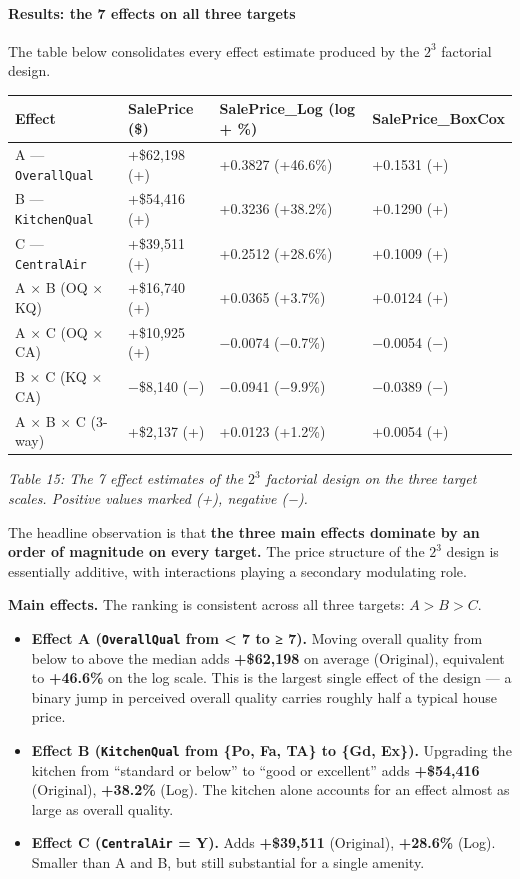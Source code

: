\paragraph{Results: the 7 effects on all three
targets}\label{results-the-7-effects-on-all-three-targets}

The table below consolidates every effect estimate produced by the
\(2^3\) factorial design.

\begin{longtable}[]{@{}llll@{}}
\toprule\noalign{}
Effect & SalePrice (\$) & SalePrice\_Log (log + \%) &
SalePrice\_BoxCox \\
\midrule\noalign{}
\endhead
\bottomrule\noalign{}
\endlastfoot
A --- \texttt{OverallQual} & +\$62,198 (+) & +0.3827 (+46.6\%) & +0.1531
(+) \\
B --- \texttt{KitchenQual} & +\$54,416 (+) & +0.3236 (+38.2\%) & +0.1290
(+) \\
C --- \texttt{CentralAir} & +\$39,511 (+) & +0.2512 (+28.6\%) & +0.1009
(+) \\
A × B (OQ × KQ) & +\$16,740 (+) & +0.0365 (+3.7\%) & +0.0124 (+) \\
A × C (OQ × CA) & +\$10,925 (+) & −0.0074 (−0.7\%) & −0.0054 (−) \\
B × C (KQ × CA) & −\$8,140 (−) & −0.0941 (−9.9\%) & −0.0389 (−) \\
A × B × C (3-way) & +\$2,137 (+) & +0.0123 (+1.2\%) & +0.0054 (+) \\
\end{longtable}

\emph{Table 15: The 7 effect estimates of the \(2^3\) factorial design
on the three target scales. Positive values marked (+), negative (−).}

The headline observation is that \textbf{the three main effects dominate
by an order of magnitude on every target.} The price structure of the
\(2^3\) design is essentially additive, with interactions playing a
secondary modulating role.

\textbf{Main effects.} The ranking is consistent across all three
targets: \(A > B > C\).

\begin{itemize}
\tightlist
\item
  \textbf{Effect A (\texttt{OverallQual} from \textless{} 7 to ≥ 7).}
  Moving overall quality from below to above the median adds
  \textbf{+\$62,198} on average (Original), equivalent to
  \textbf{+46.6\%} on the log scale. This is the largest single effect
  of the design --- a binary jump in perceived overall quality carries
  roughly half a typical house price.
\item
  \textbf{Effect B (\texttt{KitchenQual} from \{Po, Fa, TA\} to \{Gd,
  Ex\}).} Upgrading the kitchen from ``standard or below'' to ``good or
  excellent'' adds \textbf{+\$54,416} (Original), \textbf{+38.2\%}
  (Log). The kitchen alone accounts for an effect almost as large as
  overall quality.
\item
  \textbf{Effect C (\texttt{CentralAir} = Y).} Adds \textbf{+\$39,511}
  (Original), \textbf{+28.6\%} (Log). Smaller than A and B, but still
  substantial for a single amenity.
\end{itemize}

